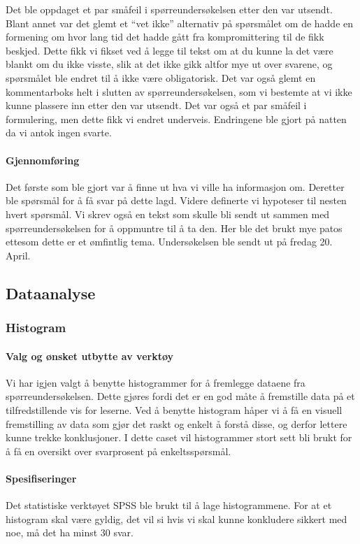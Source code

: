 Det ble oppdaget et par småfeil i spørreundersøkelsen etter den var utsendt. Blant annet var det glemt et ``vet ikke'' alternativ på spørsmålet om de hadde en formening om hvor lang tid det hadde gått fra kompromittering til de fikk beskjed. Dette fikk vi fikset ved å legge til tekst om at du kunne la det være blankt om du ikke visste, slik at det ikke gikk altfor mye ut over svarene, og spørsmålet ble endret til å ikke være obligatorisk. Det var også glemt en kommentarboks helt i slutten av spørreundersøkelsen, som vi bestemte at vi ikke kunne plassere inn etter den var utsendt. Det var også et par småfeil i formulering, men dette fikk vi endret underveis. Endringene ble gjort på natten da vi antok ingen svarte. 

\paragraph{Gjennomføring}
Det første som ble gjort var å finne ut hva vi ville ha informasjon om. Deretter ble spørsmål for å få svar på dette lagd. Videre definerte vi hypoteser til nesten hvert spørsmål. Vi skrev også en tekst som skulle bli sendt ut sammen med spørreundersøkelsen for å oppmuntre til å ta den. Her ble det brukt mye patos ettesom dette er et ømfintlig tema. Undersøkelsen ble sendt ut på fredag 20. April. 


\subsection{Dataanalyse}

\subsubsection{Histogram}

\paragraph{Valg og ønsket utbytte av verktøy}
Vi har igjen valgt å benytte histogrammer for å fremlegge dataene fra spørreundersøkelsen. Dette gjøres fordi det er en god måte å fremstille data på et tilfredstillende vis for leserne. Ved å benytte histogram håper vi å få en visuell fremstilling av data som gjør det raskt og enkelt å forstå disse, og derfor lettere kunne trekke konklusjoner. I dette caset vil histogrammer stort sett bli brukt for å få en oversikt over svarprosent på enkeltsspørsmål. 

\paragraph{Spesifiseringer}
Det statistiske verktøyet SPSS ble brukt til å lage histogrammene. For at et histogram skal være gyldig, det vil si hvis vi skal kunne konkludere sikkert med noe, må det ha minst 30 svar. 

